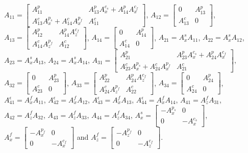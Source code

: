 $A_{11} = \left[\begin{smallmatrix}A_{11}^p & A_{13}^p A_x^{c_s} + A_{14}^p A_x^{c_f} \\ A_{13}^c A_x^{p_s} + A_{14}^c A_x^{p_f} & A_{11}^c \end{smallmatrix} \right]$,
%
$A_{12} = \left[\begin{smallmatrix} 0 & A_{13}^p \\ A_{13}^c & 0\end{smallmatrix}\right]$,
%
$A_{13} = \left[\begin{smallmatrix} A_{12}^p & A_{14}^p A_{z}^{c_f} \\ A_{14}^c A_z^{p_f} & A_{12}^c \end{smallmatrix} \right]$,
%
$A_{14} = \left[ \begin{smallmatrix}0 & A_{14}^p \\ A_{14}^c & 0\end{smallmatrix} \right]$,
%
$A_{21} = A_x^s A_{11}$,
%
$A_{22} = A_x^s A_{12}$,
%
$A_{23} = A_x^s A_{13}$,
%
$A_{24} = A_x^s A_{14}$,
%
$A_{31} = \left[\begin{smallmatrix}
    A_{21}^p & A_{23}^p A_x^{c_s} + A_{24}^p A_x^{c_f} \\
    A_{23}^c A_x^{p_s} + A_{24}^c A_x^{p_f} & A_{21}^c
\end{smallmatrix}\right]$,
%
$A_{32} = \left[\begin{smallmatrix}
    0 & A_{23}^p \\ A_{23}^c & 0
\end{smallmatrix} \right]$,
%
$A_{33} = \left[\begin{smallmatrix}
    A_{22}^p & A_{24}^p A_z^{c_f} \\ A_{24}^c A_z^{p_f} & A_{22}^c
\end{smallmatrix} \right]$,
%
$A_{34} = \left[\begin{smallmatrix}
    0 & A_{24}^p \\ A_{24}^c & 0
\end{smallmatrix} \right]$,
%
$A_{41}^\epsilon = A_x^f A_{11}$, 
%
$A_{42}^\epsilon = A_x^f A_{12}$,
%
$A_{43}^\epsilon = A_x^f A_{13}$, 
%
$A_{44}^\epsilon = A_x^f A_{14}$, 
%
$A_{41} = A_z^f A_{31}$,
%
$A_{42} = A_z^f A_{32}$,
%
$A_{43} = A_z^f A_{33}$,
%
$A_{44} = A_z^f A_{34}$,
%
$A_x^s = \left[\begin{smallmatrix}
    -A_x^{p_s} & 0 \\ 0 & -A_x^{c_s}
\end{smallmatrix} \right]$,
$A_x^f = \left[\begin{smallmatrix}
    -A_x^{p_f} & 0 \\ 0 & -A_x^{c_f}
\end{smallmatrix} \right]$ and 
$A_z^f = \left[\begin{smallmatrix}
    -A_z^{p_f} & 0 \\ 0 & -A_z^{c_f}
\end{smallmatrix} \right]$.


